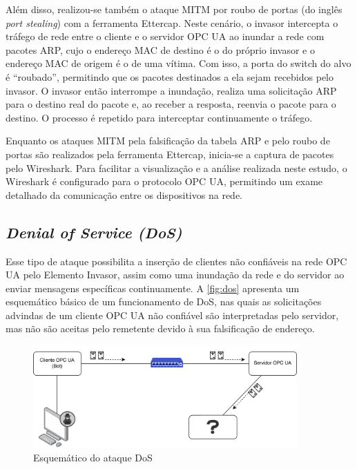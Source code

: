     Além disso, realizou-se também o ataque MITM por roubo de portas (do inglês \textit{port stealing}) com a ferramenta Ettercap. Neste cenário, o invasor intercepta o tráfego de rede entre o cliente e o servidor OPC UA ao inundar a rede com pacotes ARP, cujo o endereço MAC de destino é o do próprio invasor e o endereço MAC de origem é o de uma vítima. Com isso, a porta do switch do alvo é ``roubado'', permitindo que os pacotes destinados a ela sejam recebidos pelo invasor. O invasor então interrompe a inundação, realiza uma solicitação ARP para o destino real do pacote e, ao receber a resposta, reenvia o pacote para o destino. O processo é repetido para interceptar continuamente o tráfego.

    Enquanto os ataques MITM pela falsificação da tabela ARP e pelo roubo de portas são realizados pela ferramenta Ettercap, inicia-se a captura de pacotes pelo Wireshark. Para facilitar a visualização e a análise realizada neste estudo, o Wireshark é configurado para o protocolo OPC UA, permitindo um exame detalhado da comunicação entre os dispositivos na rede.
    
    \subsection{\textit{Denial of Service (DoS)}}

    Esse tipo de ataque possibilita a inserção de clientes não confiáveis na rede OPC UA pelo Elemento Invasor, assim como uma inundação da rede e do servidor ao enviar mensagens específicas continuamente. A \autoref{fig:dos} apresenta um esquemático básico de um funcionamento de DoS, nas quais as solicitações advindas de um cliente OPC UA não confiável são interpretadas pelo servidor, mas não são aceitas pelo remetente devido à sua falsificação de endereço.

     \begin{figure}[htbp]
        \caption{\label{fig:dos}Esquemático do ataque DoS}
        \begin{center}
            \includegraphics[width=0.9\textwidth]{USPSC-img/dos.png}
        \end{center}
    \end{figure}
    
